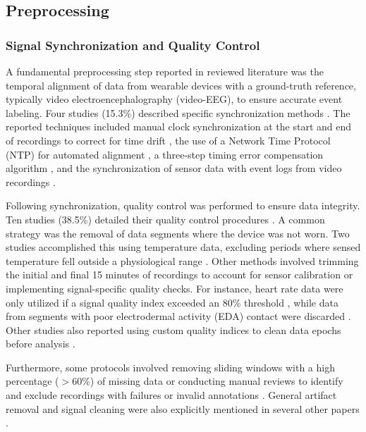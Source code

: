 \subsection{Preprocessing}

\subsubsection{Signal Synchronization and Quality Control}
A fundamental preprocessing step reported in reviewed literature was the temporal alignment of data from wearable devices with a ground-truth reference, typically video electroencephalography (video-EEG), to ensure accurate event labeling. Four studies (15.3\%) described specific synchronization methods \cite{Yu2023-ss, Vakilna2024-hk, Arends2018-ew, Tang2021-td}. The reported techniques included manual clock synchronization at the start and end of recordings to correct for time drift \cite{Yu2023-ss}, the use of a Network Time Protocol (NTP) for automated alignment \cite{Vakilna2024-hk}, a three-step timing error compensation algorithm \cite{Tang2021-td}, and the synchronization of sensor data with event logs from video recordings \cite{Arends2018-ew}.

Following synchronization, quality control was performed to ensure data integrity. Ten studies (38.5\%) detailed their quality control procedures \cite{Yu2023-ss, Li2022-ty, Arends2018-ew, Jiang2022-zu, Wang2025-my, Nasseri2021-xn, Tang2021-td, Ali2020-ke, Ge2023-ab, Hegarty-Craver2021-hk}. A common strategy was the removal of data segments where the device was not worn. Two studies accomplished this using temperature data, excluding periods where sensed temperature fell outside a physiological range \cite{Yu2023-ss, Tang2021-td}. Other methods involved trimming the initial and final 15 minutes of recordings to account for sensor calibration \cite{Yu2023-ss} or implementing signal-specific quality checks. For instance, heart rate data were only utilized if a signal quality index exceeded an 80\% threshold \cite{Arends2018-ew}, while data from segments with poor electrodermal activity (EDA) contact were discarded \cite{Li2022-ty}. Other studies also reported using custom quality indices to clean data epochs before analysis \cite{Nasseri2021-xn, Wang2025-my}.

Furthermore, some protocols involved removing sliding windows with a high percentage ($>$60\%) of missing data \cite{Jiang2022-zu} or conducting manual reviews to identify and exclude recordings with failures or invalid annotations \cite{Yu2023-ss}. General artifact removal and signal cleaning were also explicitly mentioned in several other papers \cite{Ge2023-ab, Hegarty-Craver2021-hk, Ali2020-ke}.



